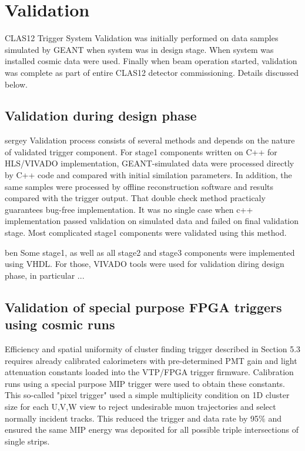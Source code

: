 \section{Validation}

CLAS12 Trigger System Validation was initially performed on data samples simulated by GEANT when system was in design stage. When system was installed cosmic data were used. Finally when beam operation started, validation was complete as part of entire CLAS12 detector commissioning. Details discussed below.

\subsection{Validation during design phase}

sergey
Validation process consists of several methods and depends on the nature of validated trigger component. For stage1 components written on C++ for HLS/VIVADO implementation,
GEANT-simulated data were processed directly by C++ code and compared with initial similation parameters. 
In addition, the same samples were processed by offline reconstruction software and results compared with the trigger output. 
That double check method practicaly guarantees bug-free implementation. It was no single case when c++ implementation passed validation on
simulated data and failed on final validation stage. Most complicated stage1 components were validated using this method.

ben
Some stage1, as well as all stage2 and stage3 components were implemented using VHDL. For those, VIVADO tools were used for validation diring design phase, in particular ...

\subsection{Validation of special purpose FPGA triggers using cosmic runs} 

Efficiency and spatial uniformity of cluster finding trigger described in Section 5.3 requires already calibrated calorimeters with pre-determined PMT gain and light attenuation constants loaded into the VTP/FPGA trigger firmware.  Calibration runs using a special purpose MIP trigger were used to obtain these constants.  This so-called "pixel trigger" used a simple multiplicity condition on 1D cluster size for each U,V,W view to reject undesirable muon trajectories and select normally incident tracks.  This reduced the trigger and data rate by 95$\%$ and ensured the same MIP energy was deposited for all possible triple intersections of single strips.  

